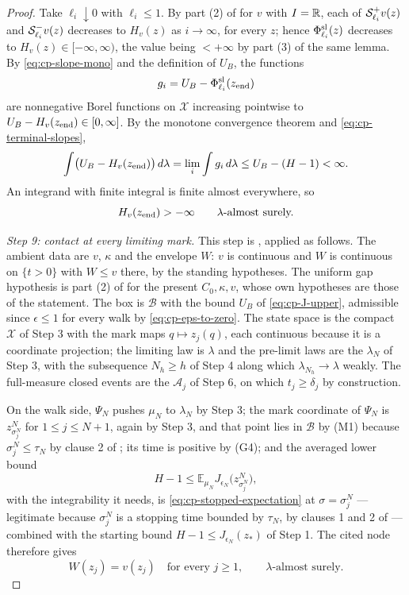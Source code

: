 \begin{proof}
Take $\ell_i\downarrow0$ with $\ell_i\le1$. By part (2) of
 for $v$ with $I=\mathbb{R}$, each of
$\mathcal{S}^+_{\ell_i}v(z)$ and $\mathcal{S}^-_{\ell_i}v(z)$ decreases to $H_v(z)$ as
$i\to\infty$, for every $z$; hence $\Phi^{\rm sl}_{\ell_i}(z)$ decreases to
$H_v(z)\in[-\infty,\infty)$, the value being $<+\infty$ by part (3) of the same
lemma. By \eqref{eq:cp-slope-mono} and the definition of $U_B$, the functions
\[
  g_i=U_B-\Phi^{\rm sl}_{\ell_i}(z_{\rm end})
\]
are nonnegative Borel functions on $\mathcal X$ increasing pointwise to
$U_B-H_v(z_{\rm end})\in[0,\infty]$. By the monotone convergence theorem and
\eqref{eq:cp-terminal-slopes},
\[
  \int\bigl(U_B-H_v(z_{\rm end})\bigr)\,d\lambda
   =\lim_i\int g_i\,d\lambda\le U_B-(H-1)<\infty .
\]
An integrand with finite integral is finite almost everywhere, so
\begin{equation}\label{eq:cp-finite-slope}
  H_v(z_{\rm end})>-\infty\qquad\lambda\text{-almost surely.}
\end{equation}

\emph{Step 9: contact at every limiting mark.}
This step is , applied as follows. The ambient
data are $v$, $\kappa$ and the envelope $W$: $v$ is continuous and $W$ is
continuous on $\{t>0\}$ with $W\le v$ there, by the standing hypotheses. The
uniform gap hypothesis is part (2) of  for the present
$C_0,\kappa,v$, whose own hypotheses are those of the statement. The box is
$\mathcal B$ with the bound $U_B$ of \eqref{eq:cp-J-upper}, admissible since
$\epsilon\le1$ for every walk by \eqref{eq:cp-eps-to-zero}. The state space is
the compact $\mathcal X$ of Step 3 with the mark maps $q\mapsto z_j(q)$, each
continuous because it is a coordinate projection; the limiting law is $\lambda$
and the pre-limit laws are the $\lambda_N$ of Step 3, with the subsequence
$N_h\ge h$ of Step 4 along which $\lambda_{N_h}\to\lambda$ weakly. The
full-measure closed events are the $\mathcal A_j$ of Step 6, on which
$t_j\ge\delta_j$ by construction.

On the walk side, $\Psi_N$ pushes $\mu_N$ to $\lambda_N$ by Step 3; the mark
coordinate of $\Psi_N$ is $z^N_{\sigma^N_j}$ for $1\le j\le N+1$, again by
Step 3, and that point lies in $\mathcal B$ by (M1) because
$\sigma^N_j\le\tau_N$ by clause 2 of ; its time is positive
by (G4); and the averaged lower bound
\[
  H-1\le\mathbb E_{\mu_N}J_{\epsilon_N}\bigl(z^N_{\sigma^N_j}\bigr),
\]
with the integrability it needs, is \eqref{eq:cp-stopped-expectation} at
$\sigma=\sigma^N_j$ --- legitimate because $\sigma^N_j$ is a stopping time
bounded by $\tau_N$, by clauses 1 and 2 of  --- combined
with the starting bound $H-1\le J_{\epsilon_N}(z_*)$ of Step 1. The cited node
therefore gives
\begin{equation}\label{eq:cp-contact-limit}
  W(z_j)=v(z_j)\quad\text{for every }j\ge1,
  \qquad\lambda\text{-almost surely.}
\end{equation}


\end{proof}
